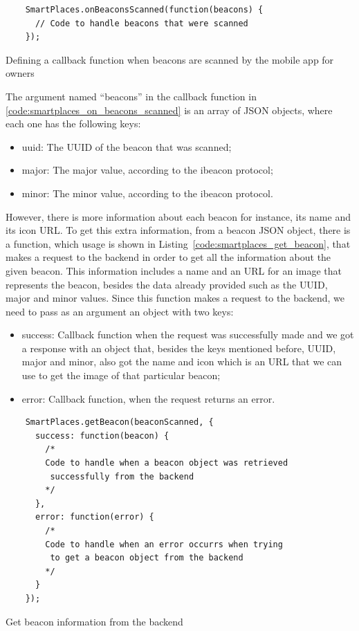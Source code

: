 \begin{listing}[H]
  \begin{verbatim}
    SmartPlaces.onBeaconsScanned(function(beacons) {
      // Code to handle beacons that were scanned
    });
  \end{verbatim}
  \caption[Beacons scanned]{Defining a callback function when beacons are scanned by the mobile app for owners}
  \label{code:smartplaces_on_beacons_scanned}
\end{listing}

The argument named ``beacons'' in the callback function in \ref{code:smartplaces_on_beacons_scanned} is an array of \gls{JSON} objects, where each one has the following keys:
\begin{itemize}
  \item uuid: The \gls{UUID} of the beacon that was scanned;
  \item major: The major value, according to the ibeacon protocol;
  \item minor: The minor value, according to the ibeacon protocol.
\end{itemize}

However, there is more information about each beacon for instance, its name and its icon \gls{URL}.
To get this extra information, from a beacon \gls{JSON} object, there is a function, which usage is shown in Listing~\ref{code:smartplaces_get_beacon}, that makes a request to the backend in order to get all the information about the given beacon. This information includes a name and an \gls{URL} for an image that represents the beacon, besides the data already provided such as the \gls{UUID}, major and minor values.
Since this function makes a request to the backend, we need to pass as an argument an object with two keys:
\begin{itemize}
  \item success: Callback function when the request was successfully made and we got a response with an object that, besides the keys mentioned before, \gls{UUID}, major and minor, also got the name and icon which is an \gls{URL} that we can use to get the image of that particular beacon;
  \item error: Callback function, when the request returns an error.
\end{itemize}

\begin{listing}[H]
  \begin{verbatim}
    SmartPlaces.getBeacon(beaconScanned, {
      success: function(beacon) {
        /*
        Code to handle when a beacon object was retrieved
         successfully from the backend
        */
      },
      error: function(error) {
        /*
        Code to handle when an error occurrs when trying
         to get a beacon object from the backend
        */
      }
    });
  \end{verbatim}
  \caption[Get beacon object]{Get beacon information from the backend}
  \label{code:smartplaces_get_beacon}
\end{listing}

